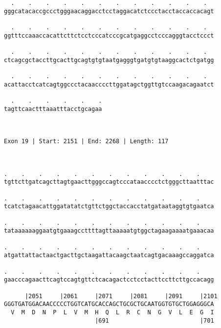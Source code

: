 \documentclass{article}
\begin{document}
\begin{Verbatim}
  .    .    .    .    .    .    .    .    .    .    .    .  
gggcatacaccgccctgggaacaggacctcctaggacatctccctacctaccaccacagt
                                                            
  .    .    .    .    .    .    .    .    .    .    .    .  
ggtttccaaaccacattcttctcctcccatcccgcatgaggcctcccagggtacctccct
                                                            
  .    .    .    .    .    .    .    .    .    .    .    .  
ctcagcgctaccttgcacttgcagtgtgtaatgagggtgatgtgtaaggcactctgatgg
                                                            
  .    .    .    .    .    .    .    .    .    .    .    .  
acattacctcatcagtggccctacaaccccttggatagctggttgtccaagacagaatct
                                                            
  .    .    .    .    .    .
tagttcaactttaaatttacctgcagaa
                            
                            
 
Exon 19 | Start: 2151 | End: 2268 | Length: 117



.    .    .    .    .    .    .    .    .    .    .    .    
tgttcttgatcagcttagtgaacttgggccagtcccataacccctctgggcttaatttac
                                                            
.    .    .    .    .    .    .    .    .    .    .    .    
tcatctagaacattggatatatctgttctggctaccacctatgataataggtgtgaatca
                                                            
.    .    .    .    .    .    .    .    .    .    .    .    
tataaaaaaggaatgtgaaagccttttagttaaaaatgtggctagaagaaaatgaaacaa
                                                            
.    .    .    .    .    .    .    .    .    .    .    .    
atgattattactaactgacttgctaagattacaagctaatcagtgacaaagccaggatca
                                                            
.    .    .    .    .    .    .    .    .    .    .    .    
gaacccagaacttcagtccagtgttctcacagactcctcctacttccttcttgccacagg
                                                            
      |2051     |2061     |2071     |2081     |2091     |2101
GGGTGATGGACAACCCCCTGGTCATGCACCAGCTGCGCTGCAATGGTGTGCTGGAGGGCA
  V  M  D  N  P  L  V  M  H  Q  L  R  C  N  G  V  L  E  G  I
                          |691                          |701
  

\end{Verbatim}
\end{document}
